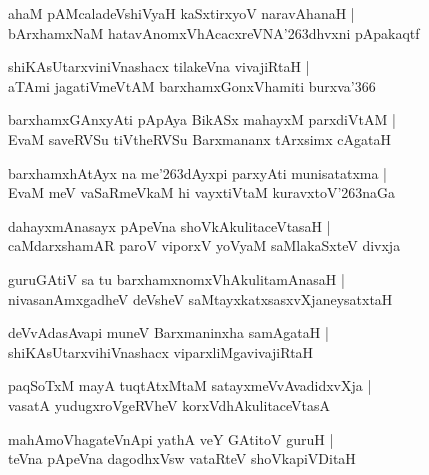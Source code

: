 \documentclass[twoside,12pt,openright]{book}
\def\S{\char'263}
\newcounter{shloka}[chapter]
\begin{document}
\begin{shloka}%
ahaM pAMcaladeVshiVyaH kaSxtirxyoV naravAhanaH |\\
bArxhamxNaM hatavAnomxVhAcacxreVNA\S dhvxni pApakaqtf
\end{shloka}

\begin{shloka}%
shiKAsUtarxviniVnashacx tilakeVna vivajiRtaH |\\
aTAmi jagatiVmeVtAM barxhamxGonxVhamiti burxva\char'366
\end{shloka}

\begin{shloka}%
barxhamxGAnxyAti pApAya BikASx mahayxM parxdiVtAM |\\
EvaM saveRVSu tiVtheRVSu Barxmananx tArxsimx cAgataH 
\end{shloka}

\begin{shloka}%
barxhamxhAtAyx na me\S dAyxpi parxyAti munisatatxma |\\
EvaM meV vaSaRmeVkaM hi vayxtiVtaM kuravxtoV\S naGa
\end{shloka}

\begin{shloka}%
dahayxmAnasayx pApeVna shoVkAkulitaceVtasaH |\\
caMdarxshamAR paroV viporxV yoVyaM saMlakaSxteV divxja 
\end{shloka}

\begin{shloka}%
guruGAtiV sa tu barxhamxnomxVhAkulitamAnasaH |\\
nivasanAmxgadheV deVsheV saMtayxkatxsasxvXjaneysatxtaH 
\end{shloka}

\begin{shloka}%
deVvAdasAvapi muneV Barxmaninxha samAgataH |\\
shiKAsUtarxvihiVnashacx viparxliMgavivajiRtaH 
\end{shloka}

\begin{shloka}%
paqSoTxM mayA tuqtAtxMtaM satayxmeVvAvadidxvXja |\\
vasatA yudugxroVgeRVheV korxVdhAkulitaceVtasA 
\end{shloka}

\begin{shloka}%
mahAmoVhagateVnApi yathA veY GAtitoV guruH |\\
teVna pApeVna dagodhxVsw vataRteV shoVkapiVDitaH 
\end{shloka}
\end{document}
